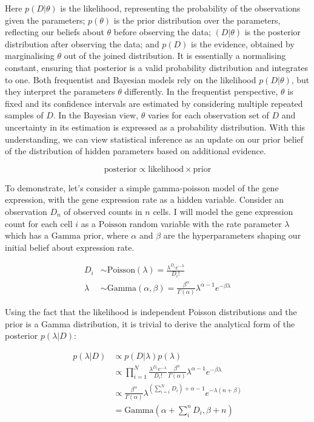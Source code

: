 Here $p({D}|\theta)$ is the likelihood, representing the probability of the observations given the parameters; $p(\theta)$ is the prior distribution over the parameters, reflecting our beliefs about $\theta$ before observing the data; $({D}| \theta)$ is the posterior distribution after observing the data; and $p({D})$ is the evidence, obtained by marginalising $\theta$ out of the joined distribution. It is essentially a normalising constant, ensuring that posterior is a valid probability distribution and integrates to one. 
Both frequentist and Bayesian models rely on the likelihood $p({D}|\theta)$, but they interpret the parameters $\theta$ differently. In the frequentist perspective, $\theta$ is fixed and its confidence intervals are estimated by considering multiple repeated samples of ${D}$. In the Bayesian view, $\theta$ varies for each observation set of ${D}$ and uncertainty in its estimation is expressed as a probability distribution. With this understanding, we can view statistical inference as an update on our prior belief of the distribution of hidden parameters based on additional evidence.

\begin{equation}
\text{posterior} \propto \text{likelihood} \times \text{prior}
\end{equation}

To demonstrate, let’s consider a simple gamma-poisson model of the gene expression, with the gene expression rate as a hidden variable. Consider an observation $D_n$  of observed counts in $n$ cells. I will model the gene expression count for each cell $i$ as a $\text{Poisson}$ random variable with the rate parameter $\lambda$ which has a $\text{Gamma}$ prior, where $\alpha$ and $\beta$ are the hyperparameters shaping our initial belief about expression rate.

\begin{align}
    D_i & \sim \text{Poisson}(\lambda) = \frac{\lambda^{D_i} e^{-\lambda}}{D_i!} \\
    \lambda & \sim \text{Gamma}(\alpha, \beta) = \frac{\beta^\alpha}{\Gamma(\alpha)} \lambda^{\alpha - 1} e^{-\beta \lambda}
\end{align}
    
Using the fact that the likelihood is independent Poisson distributions and the prior is a Gamma distribution, it is trivial to derive the analytical form of the posterior $p(\lambda|D)$:

\begin{align}
        p(\lambda|D) & \propto p(D|\lambda) p(\lambda) \\
         & \propto \prod_{i=1}^N \frac{\lambda^{D_i} e^{-\lambda}}{D_i!} \frac{\beta^\alpha}{\Gamma(\alpha)} \lambda^{\alpha - 1} e^{-\beta \lambda} \\ 
        & \propto  \frac{\beta^\alpha}{\Gamma(\alpha)} \lambda^{\left(\sum_{i=1}^N D_i\right) + \alpha - 1} e^{-\lambda(n+\beta)} \\
         & = \text{Gamma}(\alpha + \sum_i^n D_i, \beta + n)
        \label{eq:simple-gamma-poisson}
\end{align}

